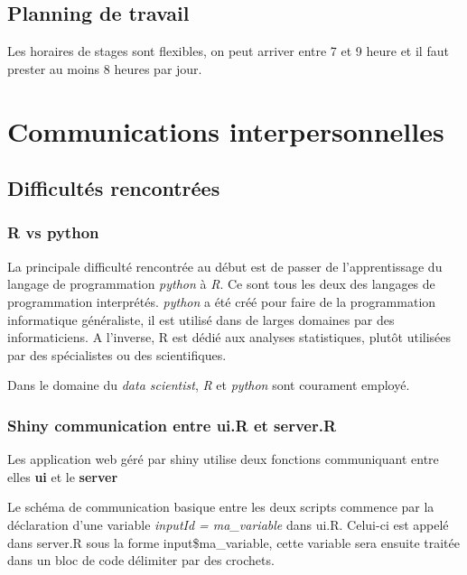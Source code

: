 \documentclass[]{report}
\begin{document}
\section{Planning de travail}\label{planning-de-travail}

Les horaires de stages sont flexibles, on peut arriver entre 7 et 9
heure et il faut prester au moins 8 heures par jour.

\chapter{Communications
interpersonnelles}\label{communications-interpersonnelles}

\section{Difficultés rencontrées}\label{difficultes-rencontrees}

\subsection{R vs python}\label{r-vs-python}

La principale difficulté rencontrée au début est de passer de
l'apprentissage du langage de programmation \emph{python} à \emph{R}. Ce
sont tous les deux des langages de programmation interprétés.
\emph{python} a été créé pour faire de la programmation informatique
généraliste, il est utilisé dans de larges domaines par des
informaticiens. A l'inverse, R est dédié aux analyses statistiques,
plutôt utilisées par des spécialistes ou des scientifiques.

Dans le domaine du \emph{data scientist}, \emph{R} et \emph{python} sont
courament employé.

\subsection{Shiny communication entre ui.R et
server.R}\label{shiny-communication-entre-ui.r-et-server.r}

Les application web géré par shiny utilise deux fonctions communiquant
entre elles \textbf{ui} et le \textbf{server}

Le schéma de communication basique entre les deux scripts commence par
la déclaration d'une variable \emph{inputId = ma\_variable} dans ui.R.
Celui-ci est appelé dans server.R sous la forme input\$ma\_variable,
cette variable sera ensuite traitée dans un bloc de code délimiter par
des crochets.
\end{document}
